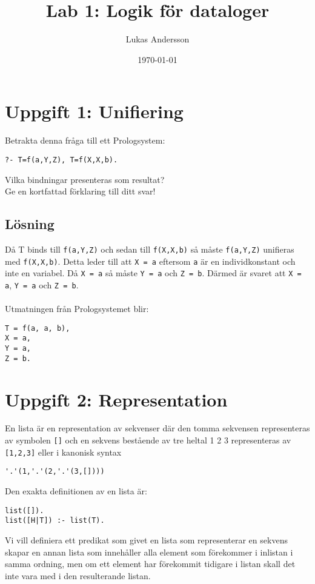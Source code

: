 \documentclass[12pt]{article}
\title{Lab 1: Logik för dataloger}
\author{Lukas Andersson}
\date{\today}
\begin{document}
\maketitle

\section*{Uppgift 1: Unifiering}
Betrakta denna fråga till ett Prologsystem:

\begin{verbatim}
?- T=f(a,Y,Z), T=f(X,X,b).
\end{verbatim}
Vilka bindningar presenteras som resultat?
\\
Ge en kortfattad förklaring till ditt svar!

\subsection*{Lösning}
Då T binds till \texttt{f(a,Y,Z)} och sedan till \texttt{f(X,X,b)} så måste \texttt{f(a,Y,Z)} unifieras med \texttt{f(X,X,b)}. Detta leder till att \texttt{X = a} eftersom \texttt{a} är en individkonstant och inte en variabel. Då \texttt{X = a} så måste \texttt{Y = a} och \texttt{Z = b}. Därmed är svaret att \texttt{X = a}, \texttt{Y = a} och \texttt{Z = b}.
\\
\\
Utmatningen från Prologsystemet blir:
\begin{verbatim}
T = f(a, a, b),
X = a,
Y = a,
Z = b.
\end{verbatim}

\section*{Uppgift 2: Representation}

En lista är en representation av sekvenser där 
den tomma sekvensen representeras av symbolen \texttt{[]} 
och en sekvens bestående av tre heltal 1 2 3 
representeras av \texttt{[1,2,3]} eller i kanonisk syntax 
\begin{verbatim}
'.'(1,'.'(2,'.'(3,[])))
\end{verbatim}

Den exakta definitionen av en lista är:

\begin{verbatim}
list([]).
list([H|T]) :- list(T).
\end{verbatim}

Vi vill definiera ett predikat som givet en lista som 
representerar en sekvens skapar en annan lista som innehåller
alla element som förekommer i inlistan i samma ordning, men 
om ett element har förekommit tidigare i listan skall det 
inte vara med i den resulterande listan.
\end{document}
